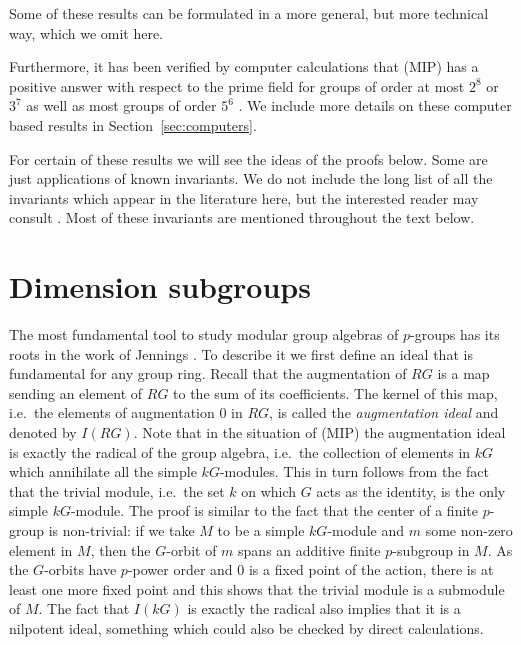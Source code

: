 \documentclass[11pt, a4paper]{amsart}
\theoremstyle{definition}
\begin{document}
Some of these results can be formulated in a more general, but more technical way, which we omit here.

Furthermore, it has been verified by computer calculations that (MIP) has a positive answer with respect to the prime field for groups of order at most $2^8$ or $3^7$ as well as most groups of order $5^6$ \cite{Wursthorn93, BleherKimmerleRoggenkampWursthorn99, Eick08, MargolisMoede}. We include more details on these computer based results in Section~\ref{sec:computers}.

For certain of these results we will see the ideas of the proofs below. Some are just applications of known invariants. We do not include the long list of all the invariants which appear in the literature here, but the interested reader may consult \cite{MargolisMoede}. Most of these invariants are mentioned throughout the text below.

\section{Dimension subgroups}\label{sec:DimensionSubgroups}

The most fundamental tool to study modular group algebras of $p$-groups has its roots in the work of Jennings \cite{Jennings41}. To describe it we first define an ideal that is fundamental for any group ring. Recall that the augmentation of $RG$ is a map sending an element of $RG$ to the sum of its coefficients. The kernel of this map, i.e.\ the elements of augmentation $0$ in $RG$, is called the \emph{augmentation ideal} and denoted by $I(RG)$. Note that in the situation of (MIP) the augmentation ideal is exactly the radical of the group algebra, i.e.\ the collection of elements in $kG$ which annihilate all the simple $kG$-modules. This in turn follows from the fact that the trivial module, i.e.\ the set $k$ on which $G$ acts as the identity, is the only simple $kG$-module. The proof is similar to the fact that the center of a finite $p$-group is non-trivial: if we take $M$ to be a simple $kG$-module and $m$ some non-zero element in $M$, then the $G$-orbit of $m$ spans an additive finite $p$-subgroup in $M$. As the $G$-orbits have $p$-power order and $0$ is a fixed point of the action, there is at least one more fixed point and this shows that the trivial module is a submodule of $M$. The fact that $I(kG)$ is exactly the radical also implies that it is a nilpotent ideal, something which could also be checked by direct calculations.
\end{document}
